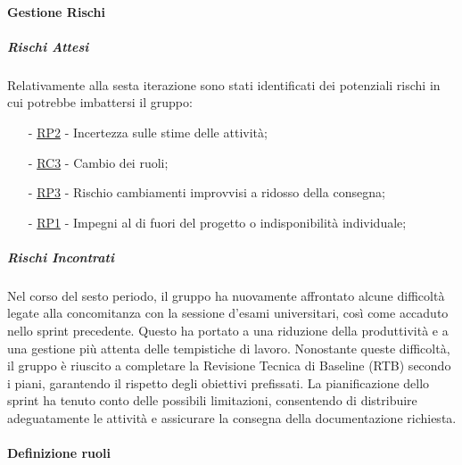 \documentclass[10pt]{article}
\begin{document}
{{{{{{{\begin{itemize}
    \end{itemize}

    \paragraph{Gestione Rischi}\mbox{}
    \vspace{-1em}
    \subparagraph*{Rischi Attesi}\mbox{}
    
    Relativamente alla sesta iterazione sono stati identificati dei potenziali rischi in cui potrebbe imbattersi il gruppo:
    \vspace{-0.5em}
    \begin{itemize}
    \setlength\itemsep{-0.2em}
    \item [-] \hyperref[RP2]{RP2} - Incertezza sulle stime delle attività;
    \item [-] \hyperref[RC3]{RC3} - Cambio dei ruoli;
    \item [-] \hyperref[RP3]{RP3} - Rischio cambiamenti improvvisi a ridosso della consegna;
    \item [-] \hyperref[RP1]{RP1} - Impegni al di fuori del progetto o indisponibilità individuale;

    \end{itemize}

    \subparagraph*{Rischi Incontrati}\mbox{}
    
    Nel corso del sesto periodo, il gruppo ha nuovamente affrontato alcune difficoltà legate alla concomitanza con la sessione d'esami universitari, così come accaduto nello sprint precedente. Questo ha portato a una riduzione della produttività e a una gestione più attenta delle tempistiche di lavoro.  
    Nonostante queste difficoltà, il gruppo è riuscito a completare la Revisione Tecnica di Baseline (RTB) secondo i piani, garantendo il rispetto degli obiettivi prefissati. La pianificazione dello sprint ha tenuto conto delle possibili limitazioni, consentendo di distribuire adeguatamente le attività e assicurare la consegna della documentazione richiesta.  

    \paragraph{Definizione ruoli}\mbox{}\vspace{0.4em}
    
}}}}}}}
\end{document}
